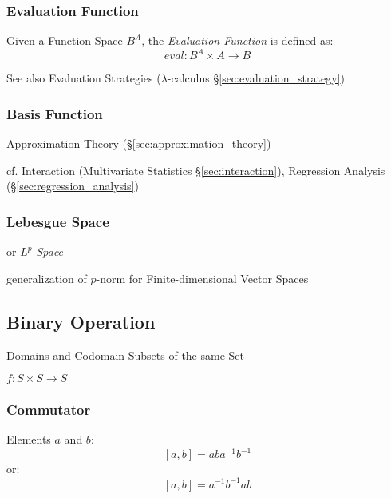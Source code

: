\subsubsection{Evaluation Function}\label{sec:evaluation_function}

Given a Function Space $B^A$, the \emph{Evaluation Function} is
defined as:
\[
  eval : B^A \times A \to B
\]

\fist See also Evaluation Strategies ($\lambda$-calculus
\S\ref{sec:evaluation_strategy})



\subsubsection{Basis Function}\label{sec:basis_function}

Approximation Theory (\S\ref{sec:approximation_theory})

cf. Interaction (Multivariate Statistics \S\ref{sec:interaction}), Regression
Analysis (\S\ref{sec:regression_analysis})



\subsubsection{Lebesgue Space}\label{sec:lebesgue_space}

or \emph{$L^p$ Space}

generalization of $p$-norm for Finite-dimensional Vector Spaces



\subsection{Binary Operation}\label{sec:binary_operation}

Domains and Codomain Subsets of the same Set

$f : S \times S \to S$



\subsubsection{Commutator}\label{sec:commutator}

Elements $a$ and $b$:
\[
  [a,b] = aba^{-1}b^{-1}
\]
or:
\[
  [a,b] = a^{-1}b^{-1}ab
\]

